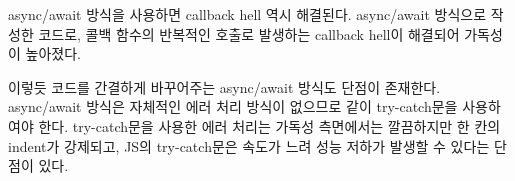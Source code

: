 async/await 방식을 사용하면 callback hell 역시 해결된다. \는 \을 async/await 방식으로 작성한 코드로, 콜백 함수의 반복적인 호출로 발생하는 callback hell이 해결되어 가독성이 높아졌다.

이렇듯 코드를 간결하게 바꾸어주는 async/await 방식도 단점이 존재한다. async/await 방식은 자체적인 에러 처리 방식이 없으므로 \과 같이 try-catch문을 사용하여야 한다. try-catch문을 사용한 에러 처리는 가독성 측면에서는 깔끔하지만 한 칸의 indent가 강제되고, JS의 try-catch문은 속도가 느려 성능 저하가 발생할 수 있다는 단점이 있다.
